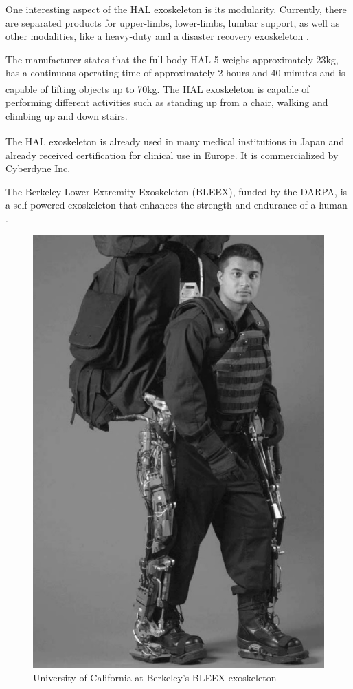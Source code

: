    One interesting aspect of the HAL exoskeleton is its modularity. Currently, there are separated products for upper-limbs, lower-limbs, lumbar support, as well as other modalities, like a heavy-duty and a disaster recovery exoskeleton \cite{cyberdyne}.
   
   The manufacturer states that the full-body HAL-5 weighs approximately 23kg, has a continuous operating time of approximately 2 hours and 40 minutes and is capable of lifting objects up to 70kg. The HAL\textsuperscript{\textregistered} exoskeleton is capable of performing different activities such as standing up from a chair, walking and climbing up and down stairs.
   
   The HAL\textsuperscript{\textregistered} exoskeleton is already used in many medical institutions in Japan and already received certification for clinical use in Europe. It is commercialized by Cyberdyne Inc.   
   
   
   
   The Berkeley Lower Extremity Exoskeleton (BLEEX), funded by the DARPA, is a self-powered exoskeleton that enhances the strength and endurance of a human \cite{Kazerooni2006}. 
   
   \begin{figure}[thpb]
      \centering
      \includegraphics[scale=0.4]{Images/BLEEX.jpg}
      \caption{University of California at Berkeley's BLEEX exoskeleton \cite{Zoss1618670}}
      \label{BLEEX}
   \end{figure}
   
